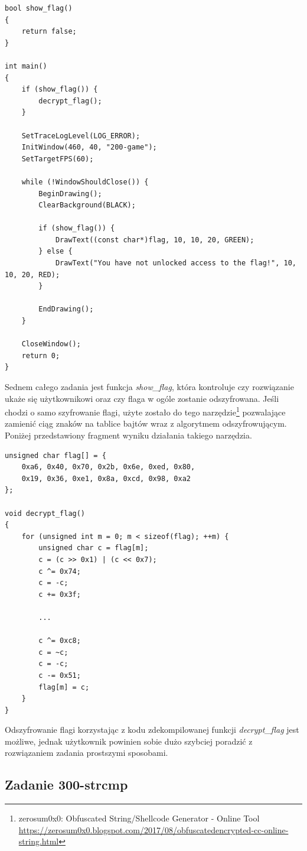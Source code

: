 \documentclass[polish,12pt]{aghthesis}
\begin{document}
\begin{verbatim}
bool show_flag()
{
    return false;
}

int main()
{
    if (show_flag()) {
        decrypt_flag();
    }

    SetTraceLogLevel(LOG_ERROR);
    InitWindow(460, 40, "200-game");
    SetTargetFPS(60);

    while (!WindowShouldClose()) {
        BeginDrawing();
        ClearBackground(BLACK);

        if (show_flag()) {
            DrawText((const char*)flag, 10, 10, 20, GREEN);
        } else {
            DrawText("You have not unlocked access to the flag!", 10, 10, 20, RED);
        }

        EndDrawing();
    }

    CloseWindow();
    return 0;
}
\end{verbatim}

Sednem całego zadania jest funkcja \emph{show\_flag}, która kontroluje czy rozwiązanie
ukaże się użytkownikowi oraz czy flaga w ogóle zostanie odszyfrowana.
Jeśli chodzi o samo szyfrowanie flagi, użyte zostało do tego narzędzie\footnote{zerosum0x0: Obfuscated String/Shellcode Generator - Online Tool \url{https://zerosum0x0.blogspot.com/2017/08/obfuscatedencrypted-cc-online-string.html}} 
pozwalające zamienić ciąg znaków na tablice bajtów wraz z algorytmem odszyfrowującym.
Poniżej przedstawiony fragment wyniku działania takiego narzędzia.

\begin{verbatim}
unsigned char flag[] = {
    0xa6, 0x40, 0x70, 0x2b, 0x6e, 0xed, 0x80,
    0x19, 0x36, 0xe1, 0x8a, 0xcd, 0x98, 0xa2
};

void decrypt_flag()
{
    for (unsigned int m = 0; m < sizeof(flag); ++m) {
        unsigned char c = flag[m];
        c = (c >> 0x1) | (c << 0x7);
        c ^= 0x74;
        c = -c;
        c += 0x3f;

        ...

        c ^= 0xc8;
        c = ~c;
        c = -c;
        c -= 0x51;
        flag[m] = c;
    }
}
\end{verbatim}

Odszyfrowanie flagi korzystając z kodu zdekompilowanej funkcji \emph{decrypt\_flag} jest możliwe,
jednak użytkownik powinien sobie dużo szybciej poradzić z rozwiązaniem zadania prostszymi
sposobami.
\clearpage

\subsection{Zadanie 300-strcmp}
\end{document}
